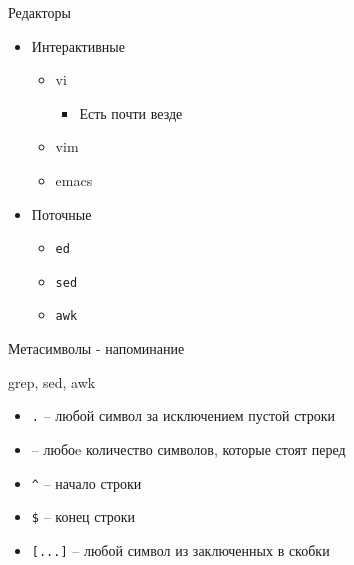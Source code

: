\begin{frame}{Редакторы}
	\begin{itemize}
		\item Интерактивные
			\begin{itemize}
				\item vi
					\begin{itemize}
						\item Есть почти везде
					\end{itemize}
				\item vim
				\item emacs
			\end{itemize}
		\item Поточные
			\begin{itemize}
				\item {\tt ed}
				\item {\tt sed}
				\item {\tt awk}
			\end{itemize}
	\end{itemize}
\end{frame}

\begin{frame}[fragile]{Метасимволы - напоминание}
	\begin{block}{grep, sed, awk}
	\end{block}
	\begin{itemize}
		\item {\tt .} -- любой символ за исключением пустой строки
		\item {\tt *} -- любоe количество символов, которые стоят перед {\tt *}
		\item {\tt \^{}} -- начало строки
		\item {\tt \$} -- конец строки
		\item {\tt [...]} -- любой символ из заключенных в скобки
	\end{itemize}
\end{frame}

